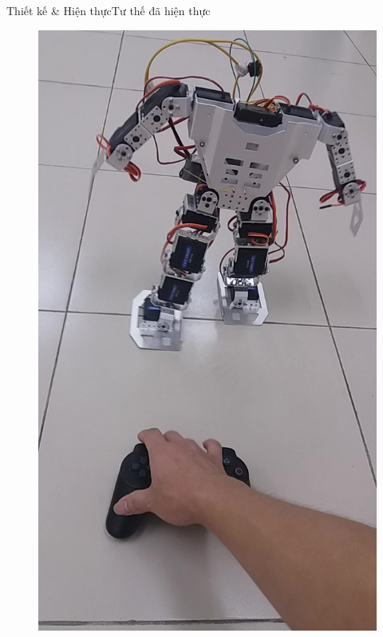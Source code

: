 \documentclass[compress, blue, 13pt,hyperref={pdfpagemode=FullScreen}]{beamer}
\begin{document}
\begin{frame}{Thiết kế \& Hiện thực}{Tư thế đã hiện thực}
\begin{multicols}{2}
\begin{figure}[hbtp]
\centering
\includegraphics[scale=0.1]{images/Results/RotateLeft.jpg}

\end{figure}
\end{multicols}
\end{frame}
\end{document}
